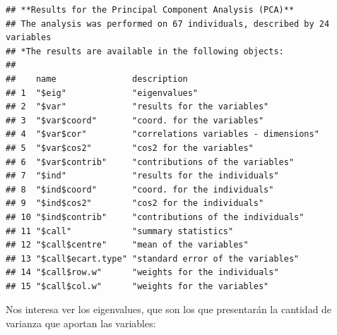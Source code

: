 \documentclass[]{article}
\newenvironment{Shaded}{\begin{snugshade}}{\end{snugshade}}
\newcommand{\NormalTok}[1]{#1}
\newcommand{\OperatorTok}[1]{\textcolor[rgb]{0.81,0.36,0.00}{\textbf{#1}}}
\newcommand{\StringTok}[1]{\textcolor[rgb]{0.31,0.60,0.02}{#1}}
\begin{document}
\begin{verbatim}
## **Results for the Principal Component Analysis (PCA)**
## The analysis was performed on 67 individuals, described by 24 variables
## *The results are available in the following objects:
## 
##    name               description                          
## 1  "$eig"             "eigenvalues"                        
## 2  "$var"             "results for the variables"          
## 3  "$var$coord"       "coord. for the variables"           
## 4  "$var$cor"         "correlations variables - dimensions"
## 5  "$var$cos2"        "cos2 for the variables"             
## 6  "$var$contrib"     "contributions of the variables"     
## 7  "$ind"             "results for the individuals"        
## 8  "$ind$coord"       "coord. for the individuals"         
## 9  "$ind$cos2"        "cos2 for the individuals"           
## 10 "$ind$contrib"     "contributions of the individuals"   
## 11 "$call"            "summary statistics"                 
## 12 "$call$centre"     "mean of the variables"              
## 13 "$call$ecart.type" "standard error of the variables"    
## 14 "$call$row.w"      "weights for the individuals"        
## 15 "$call$col.w"      "weights for the variables"
\end{verbatim}

Nos interesa ver los eigenvalues, que son los que presentarán la
cantidad de varianza que aportan las variables:

\begin{Shaded}
\end{Shaded}
\end{document}
